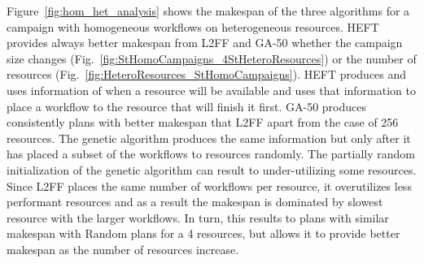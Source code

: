 Figure~\ref{fig:hom_het_analysis} shows the makespan of the three algorithms for a campaign with homogeneous workflows on heterogeneous resources.
HEFT provides always better makespan from L2FF and GA-50 whether the campaign size changes (Fig.~\ref{fig:StHomoCampaigns_4StHeteroResources}) or the number of resources (Fig.~\ref{fig:HeteroResources_StHomoCampaigns}).
HEFT produces and uses information of when a resource will be available and uses that information to place a workflow to the resource that will finish it first.
GA-50 produces consistently plans with better makespan that L2FF apart from the case of 256 resources.
The genetic algorithm produces the same information but only after it has placed a subset of the workflows to resources randomly.
The partially random initialization of the genetic algorithm can result to under-utilizing some resources.
Since L2FF places the same number of workflows per resource, it overutilizes less performant resources and as a result the makespan is dominated by slowest resource with the larger workflows.
In turn, this results to plans with similar makespan with Random plans for a 4 resources, but allows it to provide better makespan as the number of resources increase.

